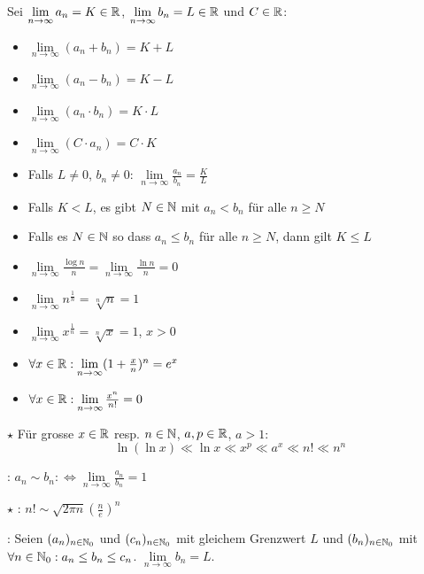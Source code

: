 \Satz Sei $\lim\limits_{n\to\infty} a_n = K \in \mathbb{R}$,
$\lim\limits_{n\to\infty} b_n = L \in \mathbb{R}$ und $C \in \mathbb{R}$:
\vspace{-0.6em}
\begin{itemize}
    \item $\lim\limits_{n\to\infty}(a_n + b_n) = K + L$
    \item $\lim\limits_{n\to\infty}(a_n - b_n) = K - L$
    \item $\lim\limits_{n\to\infty}(a_n \cdot b_n) = K \cdot L$
    \item $\lim\limits_{n\to\infty}(C \cdot a_n) = C \cdot K$
    \item Falls $L\ne 0$, $b_n\ne 0$: $\lim\limits_{n\to\infty}\frac{a_n}{b_n} = \frac{K}{L}$
    \item Falls $K < L$, es gibt $N \in \mathbb{N}$ mit $a_n < b_n$ für alle $n\ge N$
    \item Falls es $N \in \mathbb{N}$ so dass $a_n\le b_n$ für alle $n\ge N$, dann gilt $K\le L$
\end{itemize}

\Satz {}
\vspace{-0.6em}
\begin{itemize}
    \item $\lim\limits_{n\to\infty} \frac{\log n}{n} = \lim\limits_{n\to\infty} \frac{\ln n}{n} =0$
    \item $\lim\limits_{n\to\infty} n^\frac{1}{n} = \sqrt[n]{n} = 1$
    \item $\lim\limits_{n\to\infty} x^\frac{1}{n} = \sqrt[n]{x} = 1$, $x > 0$
    \item $\forall x \in \mathbb{R} : \lim\limits_{n\to\infty} (1 + \frac{x}{n})^n = e^x$
    \item $\forall x \in \mathbb{R} : \lim\limits_{n\to\infty} \frac{x^n}{n!} = 0$
\end{itemize}

\Satz $\star$ Für grosse $x \in \mathbb{R}$ resp. $n \in \mathbb{N}$, $a, p \in \mathbb{R}$, $a > 1$:
$$\ln(\ln x) \ll \ln x \ll x^p \ll a^x \ll n! \ll n^n$$

\Def {}: $a_n \sim b_n :\iff \lim\limits_{n\to\infty} \frac{a_n}{b_n} = 1$

\Satz $\star$ : $n! \sim \sqrt{2\pi n}\left(\frac{n}{e}\right)^n$

\Satz {}:
Seien $(a_n)_{n\in\mathbb{N}_0}$ und $(c_n)_{n\in\mathbb{N}_0}$ mit gleichem Grenzwert $L$ und
$(b_n)_{n\in\mathbb{N}_0}$ mit $\forall n \in \mathbb{N}_0 : a_n\le b_n\le c_n$. $\lim\limits_{n\to\infty} b_n = L$.

